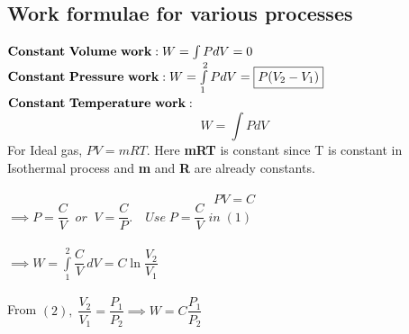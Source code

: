 \documentclass[12pt]{article}
\begin{document}
	\subsection{Work formulae for various processes}
		$\textbf{Constant\;Volume\;work}: W = \int PdV = 0$\\
		$\textbf{Constant\;Pressure\;work}: W = \int \limits_1^2 PdV = \boxed{P(V_2-V_1)}$\\
		$\textbf{Constant\;Temperature\;work}:$
		\begin{equation} W = \int PdV
		\end{equation}
		For Ideal gas, $PV=mRT$. Here \textbf{mRT} is constant since T is constant in Isothermal process and \textbf{m} and \textbf{R} are already constants.\\\\
		\begin{equation}
		PV = C
		\end{equation}	
 		$\implies P = \dfrac{C}{V}\;\;or\;\;V = \dfrac{C}{P}.\quad Use\;P = \dfrac{C}{V}\;in\;(1)$\\\\
		$\implies W = \int\limits_1^2\dfrac{C}{V}\,dV = \boxed{C\ln\dfrac{V_2}{V_1}}$\\\\
		From $(2),\;\dfrac{V_2}{V_1} = \dfrac{P_1}{P_2} \implies \boxed{W = C\dfrac{P_1}{P_2}}$
		
		
		
\end{document}
